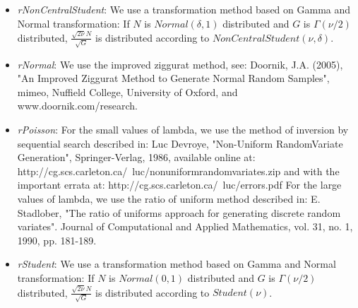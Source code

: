 \begin{itemize}
\item \textit{rNonCentralStudent}: We use a transformation method based on Gamma and Normal transformation:
If $N$ is $Normal(\delta, 1)$ distributed and $G$ is $\Gamma(\nu / 2)$ distributed,   $\frac{\sqrt{2 \nu} N }{ \sqrt{G}}$ is distributed according to $NonCentralStudent(\nu, \delta)$.
\item \textit{rNormal}:  We use the improved ziggurat method, see:
Doornik, J.A. (2005), "An Improved Ziggurat Method to Generate Normal
Random Samples", mimeo, Nuffield College, University of Oxford,
and www.doornik.com/research.
\item \textit{rPoisson}: For the small values of lambda, we use the method of inversion by sequential search described in:
Luc Devroye, "Non-Uniform RandomVariate Generation", Springer-Verlag, 1986, available online at:
http://cg.scs.carleton.ca/~luc/nonuniformrandomvariates.zip
and with the important errata at:
http://cg.scs.carleton.ca/~luc/errors.pdf
For the large values of lambda, we use the ratio of uniform method described in:
E. Stadlober, "The ratio of uniforms approach for generating discrete random variates". Journal of Computational and Applied Mathematics, vol. 31, no. 1, 1990, pp. 181-189.
\item \textit{rStudent}: We use a transformation method based on Gamma and Normal transformation:
If $N$ is $Normal(0, 1)$ distributed and $G$ is $\Gamma(\nu / 2)$ distributed,
$\frac{\sqrt{2 \nu} N }{ \sqrt{G}}$ is distributed according to $Student(\nu)$.
\end{itemize}
